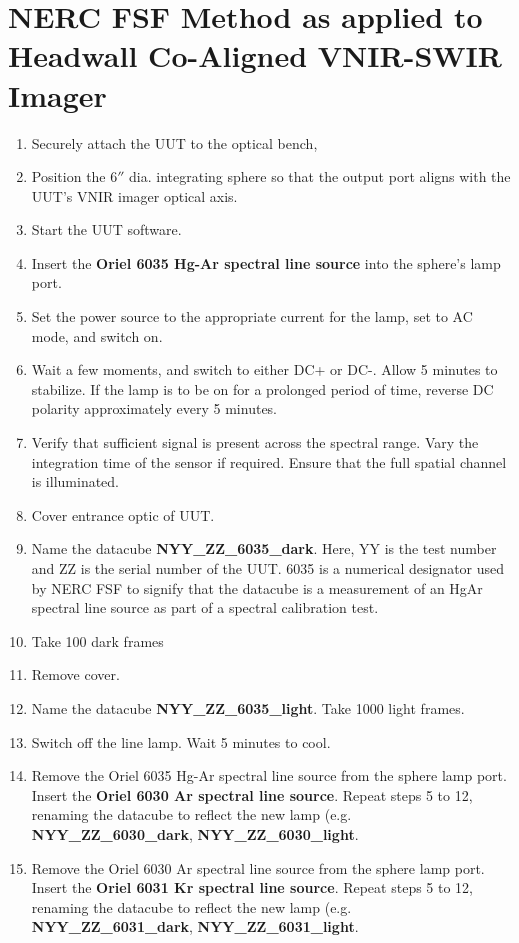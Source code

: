 \documentclass[nohyper,nobib]{tufte-book}
\begin{document}
\section{NERC FSF Method as applied to Headwall Co-Aligned VNIR-SWIR Imager}

\begin{enumerate}
	\item Securely attach the UUT to the optical bench,
	\item Position the 6$''$ dia. integrating sphere so that the output port aligns with the UUT's VNIR imager optical axis. 
	\item Start the UUT software.
	\item Insert the \textbf{Oriel 6035 Hg-Ar spectral line source} into the sphere's lamp port. 
	\item Set the power source to the appropriate current for the lamp, set to AC mode, and switch on.
	\item Wait a few moments, and switch to either DC+ or DC-. Allow 5 minutes to stabilize. If the lamp is to be on for a prolonged period of time, reverse DC polarity approximately every 5 minutes. 
	\item Verify that sufficient signal is present across the spectral range. Vary the integration time of the sensor if required. Ensure that the full spatial channel is illuminated. 
	\item Cover entrance optic of UUT.  
	\item Name the datacube \textbf{NYY\_ZZ\_6035\_dark}. Here, YY is the test number and ZZ is the serial number of the UUT. 6035 is a numerical designator used by NERC FSF to signify that the datacube is a measurement of an HgAr spectral line source as part of a spectral calibration test. 
	\item Take 100 dark frames
	\item Remove cover.
	\item Name the datacube \textbf{NYY\_ZZ\_6035\_light}. Take 1000 light frames.
	\item Switch off the line lamp. Wait 5 minutes to cool. 
	\item Remove the Oriel 6035 Hg-Ar spectral line source from the sphere lamp port. Insert the \textbf{Oriel 6030 Ar spectral line source}.  Repeat steps  5 to 12, renaming the datacube to reflect the new lamp (e.g.   \textbf{NYY\_ZZ\_6030\_dark},  \textbf{NYY\_ZZ\_6030\_light}.
	\item Remove the Oriel 6030 Ar spectral line source from the sphere lamp port. Insert the \textbf{Oriel 6031 Kr spectral line source}.  Repeat steps  5 to 12, renaming the datacube to reflect the new lamp (e.g.   \textbf{NYY\_ZZ\_6031\_dark},  \textbf{NYY\_ZZ\_6031\_light}.

\end{enumerate}
\end{document}
